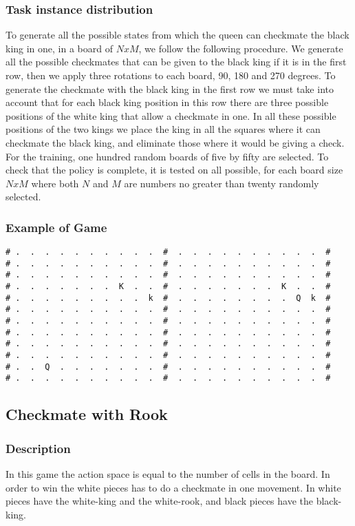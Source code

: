 \documentclass[a4paper]{article}
\begin{document}
\subsubsection{Task instance distribution}
To generate all the possible states from which the queen can checkmate the black king in one, in a board of $NxM$, we follow the following procedure. We generate all the possible checkmates that can be given to the black king if it is in the first row, then we apply three rotations to each board, 90, 180 and 270 degrees. To generate the checkmate with the black king in the first row we must take into account that for each black king position in this row there are three possible positions of the white king that allow a checkmate in one. In all these possible positions of the two kings we place the king in all the squares where it can checkmate the black king, and eliminate those where it would be giving a check. For the training, one hundred random boards of five by fifty are selected. To check that the policy is complete, it is tested on all possible, for each board size $NxM$ where both $N$ and $M$ are numbers no greater than twenty randomly selected.

\subsubsection{Example of Game}
\begin{Verbatim}[fontsize=\footnotesize]
# .  .  .  .  .  .  .  .  .  .  #  .  .  .  .  .  .  .  .  .  .  #
# .  .  .  .  .  .  .  .  .  .  #  .  .  .  .  .  .  .  .  .  .  #
# .  .  .  .  .  .  .  .  .  .  #  .  .  .  .  .  .  .  .  .  .  #
# .  .  .  .  .  .  .  K  .  .  #  .  .  .  .  .  .  .  K  .  .  #
# .  .  .  .  .  .  .  .  .  k  #  .  .  .  .  .  .  .  .  Q  k  #
# .  .  .  .  .  .  .  .  .  .  #  .  .  .  .  .  .  .  .  .  .  #
# .  .  .  .  .  .  .  .  .  .  #  .  .  .  .  .  .  .  .  .  .  #
# .  .  .  .  .  .  .  .  .  .  #  .  .  .  .  .  .  .  .  .  .  #
# .  .  .  .  .  .  .  .  .  .  #  .  .  .  .  .  .  .  .  .  .  #
# .  .  .  .  .  .  .  .  .  .  #  .  .  .  .  .  .  .  .  .  .  #
# .  .  Q  .  .  .  .  .  .  .  #  .  .  .  .  .  .  .  .  .  .  #
# .  .  .  .  .  .  .  .  .  .  #  .  .  .  .  .  .  .  .  .  .  #
\end{Verbatim}

\subsection{Checkmate with Rook}
\subsubsection{Description}
In this game the action space is equal to the number of cells in the board. In order to win the white pieces has to do a checkmate in one movement. In white pieces have the white-king and the white-rook, and black pieces have the black-king.
\end{document}
